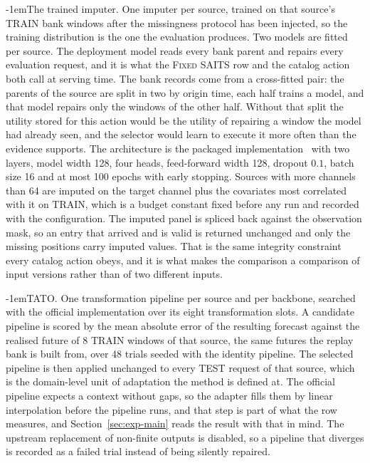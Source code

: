 \documentclass{article}
\makeatletter
\def\paragraph{\@startsection{paragraph}{4}{\z@}{1.1ex plus 0.3ex minus .2ex}%
  {-1em}{\normalsize\bf}}
\makeatother
\begin{document}
\paragraph{The trained imputer.} One imputer per source, trained on that source's TRAIN bank
windows after the missingness protocol has been injected, so the training distribution is the
one the evaluation produces. Two models are fitted per source. The deployment model reads every
bank parent and repairs every evaluation request, and it is what the \textsc{Fixed SAITS} row
and the catalog action both call at serving time. The bank records come from a cross-fitted
pair: the parents of the source are split in two by origin time, each half trains a model, and
that model repairs only the windows of the other half. Without that split the utility stored
for this action would be the utility of repairing a window the model had already seen, and the
selector would learn to execute it more often than the evidence supports. The architecture is the packaged implementation~\citep{du2023pypots} with
two layers, model width 128, four heads, feed-forward width 128, dropout $0.1$, batch size 16
and at most 100 epochs with early stopping. Sources with more channels than
64 are imputed on the target channel plus the covariates most correlated with it
on TRAIN, which is a budget constant fixed before any run and recorded with the configuration.
The imputed panel is spliced back against the observation mask, so an entry that arrived and is
valid is returned unchanged and only the missing positions carry imputed values. That is the
same integrity constraint every catalog action obeys, and it is what makes the comparison a
comparison of input versions rather than of two different inputs.

\paragraph{TATO.} One transformation pipeline per source and per backbone, searched with the
official implementation over its eight transformation slots. A candidate pipeline is scored by
the mean absolute error of the resulting forecast against the realised future of
8 TRAIN windows of that source, the same futures the replay bank is built from,
over 48 trials seeded with the identity pipeline. The selected pipeline is then
applied unchanged to every TEST request of that source, which is the domain-level unit of
adaptation the method is defined at. The official pipeline expects a context without gaps, so
the adapter fills them by linear interpolation before the pipeline runs, and that step is
part of what the row measures, and Section~\ref{sec:exp-main} reads the result with that in
mind. The upstream replacement of non-finite outputs is disabled, so a pipeline that diverges
is recorded as a failed trial instead of being silently repaired.
\end{document}
